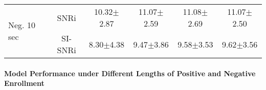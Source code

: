 \begin{table}[!t]
\begin{center}
{\begin{tabular}{lccccc}
\midrule
\multirow{2}{*}{{Neg. 10 sec}} & SNRi   & 10.32$\pm$2.87 & 11.07$\pm$2.59 & 11.08$\pm$2.69 & 11.07$\pm$2.50 \\
           & SI-SNRi & 8.30$\pm$4.38 & 9.47$\pm$3.86 & 9.58$\pm$3.53 & 9.62$\pm$3.56 \\
\bottomrule
\end{tabular}}
\end{center}
\vskip -0.1in
\end{table}

\paragraph{Model Performance under Different Lengths of Positive and Negative Enrollment} 

